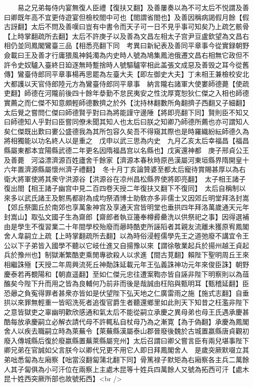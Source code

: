 　　易之兄弟每侍内宴無復人臣禮【復扶又翻】及善屢奏以為不可太后不悦謂及善曰卿既年高不宜更侍遊宴但檢校閤中可也【閤謂省閤也】及善因稱病謁假月餘【假古訝翻】太后不問及善嘆曰豈有中書令而天子可一日不見乎事可知矣乃上疏乞骸骨【上時掌翻疏所去翻】太后不許庚子以及善為文昌左相太子宫尹豆盧欽望為文昌右相仍並同鳳閣鸞臺三品【相悉亮翻下同　考異曰新紀表及善同平章事今從實録朝野僉載曰王及善才行庸猥風神鈍濁為内史時人號為鳩集鳳池俄遷文昌右相無它政但不許令史奴驢入臺終日廹逐無時蹔捨時人號驅驢宰相此盖張文成惡及善毁之耳今從舊傳】鸞臺侍郎同平章事楊再思罷為左臺大夫【即左御史大夫】丁未相王兼檢校安北大都護以天官侍郎陸元方為鸞臺侍郎同平章事　納言隴右諸軍大使婁師德薨【使疏吏翻】師德在河隴前後四十餘年㳟勤不怠民夷安之性沈厚寛恕狄仁傑之入相也師德實薦之而仁傑不知意頗輕師德數擠之於外【沈持林翻數所角翻擠子西翻又子細翻】太后覺之嘗問仁傑曰師德賢乎對曰為將能謹守邊陲【將即亮翻下同】賢則臣不知又曰師德知人乎對曰臣嘗同僚未聞其知人也太后曰朕之知卿乃師德所薦也亦可謂知人矣仁傑既出歎曰婁公盛德我為其所包容久矣吾不得窺其際也是時羅織紛紜師德久為將相獨能以功名終人以是重之　戊申以武三思為内史　九月乙亥太后幸福昌【福昌縣屬東都本宜陽縣武德二年更名因隋福昌宫以名縣也】戊寅還神都　庚子邢貞公王及善薨　河溢漂濟源百姓廬舍千餘家【濟源本春秋時原邑漢屬河東垣縣界隋開皇十六年置濟源縣屬懷州濟子禮翻】　冬十月丁亥論贊婆至都太后寵待賞賜甚厚以為右衛大將軍使將其衆守洪源谷【洪源谷在凉州昌松縣界使將即亮翻】　太子相王諸子復出閤【相王諸子幽宫中見二百四卷天授二年復扶又翻下不復同】　太后自稱制以來多以武氏諸王及駙馬都尉為成均祭酒博士助敎亦多非儒士又因郊丘明堂拜洛封嵩【郊丘祭圜丘於南郊也享萬象神宫及享通天宫皆明堂也垂拱四年拜洛萬歲通天元年封嵩山】取弘文國子生為齋郎【齋郎者執豆籩奉樽彛罍洗以供祭祀之事】因得選補由是學生不復習業二十年間學校殆廢而曏時酷吏所誣䧟者其親友流離未獲原宥鳳閣舍人韋嗣立上疏【上時掌翻疏所去翻】以為時俗浸輕儒學先王之道弛廢不講宜令王公以下子弟皆入國學不聽以它岐仕進又自揚豫以來【謂徐敬業起兵於揚州越王貞起兵於豫州也】制獄漸繁酷吏乘閒專欲殺人以求進【間古莧翻】賴陛下聖明周丘王來相繼誅殛【天授二年周興流死丘神勣誅延載元年王弘義誅神功元年來俊臣誅】朝野慶泰若再覩陽和【朝直遥翻】至如仁傑元忠往遭案鞫亦皆自誣非陛下明察則以為葅醢矣今陛下升而用之皆為良輔何乃前非而後是哉誠由枉陷與甄明耳【甄稽延翻】臣恐曏之負寃得罪者甚衆亦皆如是伏望陛下弘天地之仁廣雷雨之施【施式志翻】自垂拱以來罪無輕重一皆昭洗死者追復官爵生者聽還鄉里如此則天下知昔之枉濫非陛下之意皆獄吏之辜幽明歡欣感通和氣太后不能從嗣立承慶之異母弟也母王氏遇承慶甚酷每放承慶嗣立必解衣請代母不許輒私自杖母乃為之漸寛【為于偽翻】承慶為鳳閣舍人以疾去職嗣立時為萊蕪令【萊蕪縣漢屬泰山郡晉廢後魏於古城置嬴縣唐貞觀初廢入傳城縣后復於廢嬴縣置蕪萊縣屬兖州】太后召謂曰卿父嘗言臣有兩兒堪事陛下卿兄弟在官誠如父言朕今以卿代兄更不用它人即日拜鳳閣舍人　是歲突厥默啜立其弟咄悉匐為左廂察【咄當沒翻匐蒲北翻下同】骨篤禄子默矩為右廂察各主兵二萬餘人其子匐俱為小可汗位在兩察上主處木昆等十姓兵四萬餘人又號為拓西可汗【處木昆十姓西突厥所部也故號拓西】<br />

